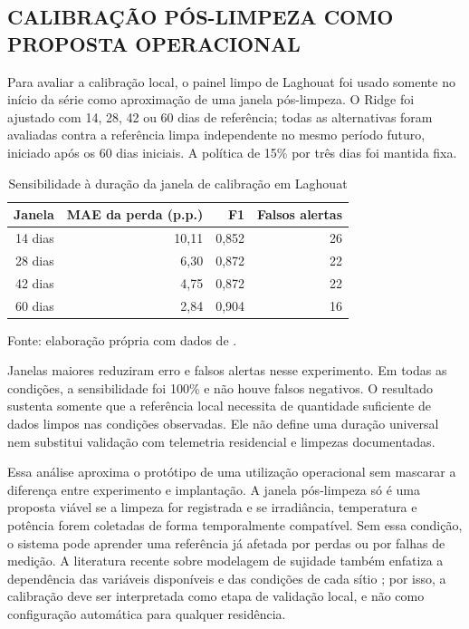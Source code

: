 \documentclass{UNESC}
\begin{document}
\subsection{CALIBRAÇÃO PÓS-LIMPEZA COMO PROPOSTA OPERACIONAL}

Para avaliar a calibração local, o painel limpo de Laghouat foi usado somente no início da série como aproximação de uma janela pós-limpeza. O Ridge foi ajustado com 14, 28, 42 ou 60 dias de referência; todas as alternativas foram avaliadas contra a referência limpa independente no mesmo período futuro, iniciado após os 60 dias iniciais. A política de 15\% por três dias foi mantida fixa.

\begin{table}[htbp]
\centering
\caption{Sensibilidade à duração da janela de calibração em Laghouat}
\label{tab:calibracao}
\small
\begin{tabular}{@{}rrrr@{}}
\toprule
Janela & MAE da perda (p.p.) & F1 & Falsos alertas \\
\midrule
14 dias & 10,11 & 0,852 & 26 \\
28 dias & 6,30 & 0,872 & 22 \\
42 dias & 4,75 & 0,872 & 22 \\
60 dias & 2,84 & 0,904 & 16 \\
\bottomrule
\end{tabular}
\par\smallskip\raggedright\footnotesize Fonte: elaboração própria com dados de .
\end{table}

Janelas maiores reduziram erro e falsos alertas nesse experimento. Em todas as condições, a sensibilidade foi 100\% e não houve falsos negativos. O resultado sustenta somente que a referência local necessita de quantidade suficiente de dados limpos nas condições observadas. Ele não define uma duração universal nem substitui validação com telemetria residencial e limpezas documentadas.

Essa análise aproxima o protótipo de uma utilização operacional sem mascarar a diferença entre experimento e implantação. A janela pós-limpeza só é uma proposta viável se a limpeza for registrada e se irradiância, temperatura e potência forem coletadas de forma temporalmente compatível. Sem essa condição, o sistema pode aprender uma referência já afetada por perdas ou por falhas de medição. A literatura recente sobre modelagem de sujidade também enfatiza a dependência das variáveis disponíveis e das condições de cada sítio \cite{tsanakas2025}; por isso, a calibração deve ser interpretada como etapa de validação local, e não como configuração automática para qualquer residência.
\end{document}
